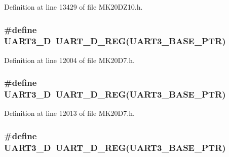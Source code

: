 Definition at line 13429 of file M\+K20\+D\+Z10.\+h.

\subsubsection[{\texorpdfstring{U\+A\+R\+T3\+\_\+D}{UART3_D}}]{\setlength{\rightskip}{0pt plus 5cm}\#define U\+A\+R\+T3\+\_\+D~{\bf U\+A\+R\+T\+\_\+\+D\+\_\+\+R\+EG}({\bf U\+A\+R\+T3\+\_\+\+B\+A\+S\+E\+\_\+\+P\+TR})}\hypertarget{group___u_a_r_t___register___accessor___macros_gaa869b8866c1e0c8d50e7b3c015743211}{}\label{group___u_a_r_t___register___accessor___macros_gaa869b8866c1e0c8d50e7b3c015743211}


Definition at line 12004 of file M\+K20\+D7.\+h.

\subsubsection[{\texorpdfstring{U\+A\+R\+T3\+\_\+D}{UART3_D}}]{\setlength{\rightskip}{0pt plus 5cm}\#define U\+A\+R\+T3\+\_\+D~{\bf U\+A\+R\+T\+\_\+\+D\+\_\+\+R\+EG}({\bf U\+A\+R\+T3\+\_\+\+B\+A\+S\+E\+\_\+\+P\+TR})}\hypertarget{group___u_a_r_t___register___accessor___macros_gaa869b8866c1e0c8d50e7b3c015743211}{}\label{group___u_a_r_t___register___accessor___macros_gaa869b8866c1e0c8d50e7b3c015743211}


Definition at line 12013 of file M\+K20\+D7.\+h.

\subsubsection[{\texorpdfstring{U\+A\+R\+T3\+\_\+D}{UART3_D}}]{\setlength{\rightskip}{0pt plus 5cm}\#define U\+A\+R\+T3\+\_\+D~{\bf U\+A\+R\+T\+\_\+\+D\+\_\+\+R\+EG}({\bf U\+A\+R\+T3\+\_\+\+B\+A\+S\+E\+\_\+\+P\+TR})}\hypertarget{group___u_a_r_t___register___accessor___macros_gaa869b8866c1e0c8d50e7b3c015743211}{}\label{group___u_a_r_t___register___accessor___macros_gaa869b8866c1e0c8d50e7b3c015743211}


